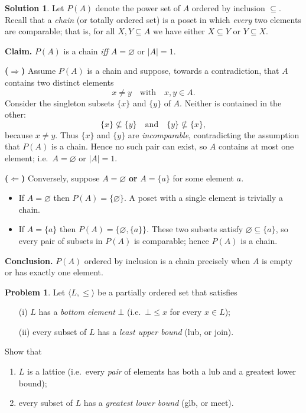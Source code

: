 \documentclass[12pt]{article}
\theoremstyle{definition} %
\newtheorem{solution}{Solution}
\newtheorem{problem}{Problem}
\theoremstyle{plain} %
\begin{document}
  \begin{solution}
    Let $P(A)$ denote the power set of $A$ ordered by inclusion $\subseteq$.
    Recall that a \emph{chain} (or totally ordered set) is a poset in which \emph{every} two elements are comparable;  
    that is, for all $X,Y\subseteq A$ we have either $X\subseteq Y$ or $Y\subseteq X$.
    
    \bigskip
    \textbf{Claim.}  
    $P(A)$ is a chain \emph{iff} $A=\varnothing$ or $|A|=1$.
    
    \medskip
    \textbf{($\Longrightarrow$)}  
    Assume $P(A)$ is a chain and suppose, towards a contradiction, that $A$ contains two distinct elements
    \[
    x\neq y\quad\text{with}\quad x,y\in A.
    \]
    Consider the singleton subsets $\{x\}$ and $\{y\}$ of $A$.
    Neither is contained in the other:
    \[
    \{x\}\not\subseteq\{y\}
    \quad\text{and}\quad
    \{y\}\not\subseteq\{x\},
    \]
    because $x\neq y$.  
    Thus $\{x\}$ and $\{y\}$ are \emph{incomparable}, contradicting the assumption that $P(A)$ is a chain.
    Hence no such pair can exist, so $A$ contains at most one element; i.e.\ $A=\varnothing$ or $|A|=1$.
    
    \medskip
    \textbf{($\Longleftarrow$)}  
    Conversely, suppose $A=\varnothing$ \textbf{or} $A=\{a\}$ for some element $a$.
    
    \begin{itemize}
      \item If $A=\varnothing$ then $P(A)=\{\varnothing\}$.
            A poset with a single element is trivially a chain.
    
      \item If $A=\{a\}$ then $P(A)=\{\varnothing,\{a\}\}$.
            These two subsets satisfy $\varnothing\subseteq\{a\}$,
            so every pair of subsets in $P(A)$ is comparable; hence $P(A)$ is a chain.
    \end{itemize}
    
    \medskip
    \textbf{Conclusion.}  
    $P(A)$ ordered by inclusion is a chain precisely when $A$ is empty or has exactly one element.
    \end{solution}
    \begin{problem}
      Let $\langle L,\le\rangle$ be a partially ordered set that satisfies
      
      \begin{enumerate}
          \item[(i)] $L$ has a \emph{bottom element}\/ $\bot$ (i.e.\ $\bot\le x$ for every $x\in L$);
          \item[(ii)] every subset of $L$ has a \emph{least upper bound} (lub, or join).
      \end{enumerate}
      
      Show that
      \begin{enumerate}[label=(\alph*)]
          \item $L$ is a lattice (i.e.\ every \emph{pair} of elements has both a lub and a greatest lower bound);
          \item every subset of $L$ has a \emph{greatest lower bound} (glb, or meet).
      \end{enumerate}
      \end{problem}
      
\end{document}
